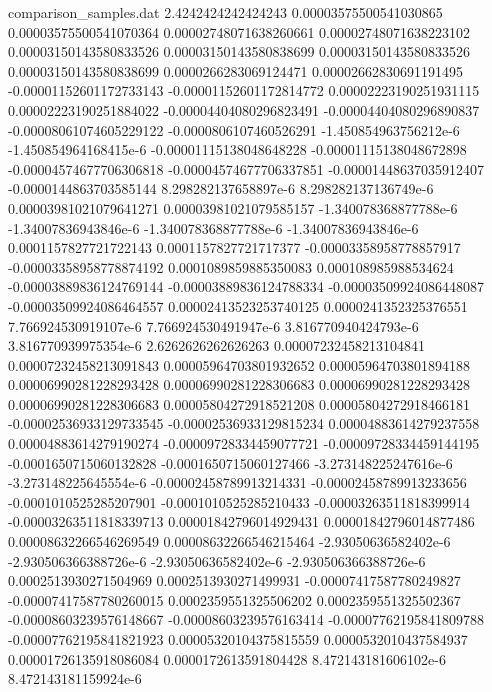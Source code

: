 \begin{filecontents}{comparison_samples.dat}
2.4242424242424243  0.00003575500541030865  0.00003575500541070364  0.00002748071638260661 0.00002748071638223102 0.00003150143580833526 0.00003150143580838699 0.00003150143580833526 0.00003150143580838699 0.0000266283069124471  0.00002662830691191495 -0.00001152601172733143 -0.00001152601172814772 0.00002223190251931115 0.00002223190251884022 -0.00004404080296823491 -0.00004404080296890837 -0.00008061074605229122 -0.0000806107460526291  -1.450854963756212e-6   -1.450854964168415e-6   -0.00001115138048648228 -0.00001115138048672898 -0.00004574677706306818 -0.00004574677706337851 -0.00001448637035912407 -0.0000144863703585144  8.298282137658897e-6   8.298282137136749e-6   0.00003981021079641271 0.00003981021079585157 -1.340078368877788e-6   -1.34007836943846e-6    -1.340078368877788e-6   -1.34007836943846e-6    0.0001157827721722143  0.0001157827721717377  -0.00003358958778857917 -0.00003358958778874192 0.0001089859885350083  0.000108985988534624   -0.00003889836124769144 -0.00003889836124788334 -0.00003509924086448087 -0.00003509924086464557 0.00002413523253740125 0.0000241352325376551  7.766924530919107e-6   7.766924530491947e-6   3.816770940424793e-6    3.816770939975354e-6  
2.6262626262626263  0.00007232458213104841  0.00007232458213091843  0.00005964703801932652 0.00005964703801894188 0.00006990281228293428 0.00006990281228306683 0.00006990281228293428 0.00006990281228306683 0.00005804272918521208 0.00005804272918466181 -0.00002536933129733545 -0.00002536933129815234 0.00004883614279237558 0.00004883614279190274 -0.00009728334459077721 -0.00009728334459144195 -0.0001650715060132828  -0.0001650715060127466  -3.273148225247616e-6   -3.273148225645554e-6   -0.00002458789913214331 -0.00002458789913233656 -0.0001010525285207901  -0.0001010525285210433  -0.00003263511818399914 -0.00003263511818339713 0.00001842796014929431 0.00001842796014877486 0.00008632266546269549 0.00008632266546215464 -2.93050636582402e-6    -2.930506366388726e-6   -2.93050636582402e-6    -2.930506366388726e-6   0.0002513930271504969  0.0002513930271499931  -0.00007417587780249827 -0.00007417587780260015 0.0002359551325506202  0.0002359551325502367  -0.00008603239576148667 -0.00008603239576163414 -0.00007762195841809788 -0.00007762195841821923 0.00005320104375815559 0.0000532010437584937  0.00001726135918086084 0.0000172613591804428  8.472143181606102e-6    8.472143181159924e-6  

\end{filecontents}
